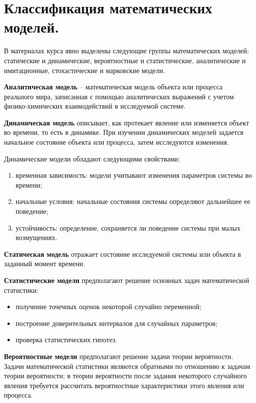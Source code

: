 \section{Классификация математических моделей.}

В материалах курса явно выделены следующие группы математических моделей:
статические и динамические, вероятностные и статистические, аналитические и
имитационные, стохастические и марковские модели.

\textbf{Аналитическая модель} -- математическая модель объекта или процесса
реального мира, записанная с помощью аналитических выражений с учетом
физико-химических взаимодействий в исследуемой системе.

\textbf{Динамическая модель} описывает, как протекает явление или изменяется
объект во времени, то есть в динамике. При изучении динамических моделей
задается начальное состояние объекта или процесса, затем исследуются
изменения.

Динамические модели обладают следующими свойствами:
\begin{enumerate}
  \item временная зависимость: модели учитывают изменения параметров
  системы во времени;
  \item начальные условия: начальные состояния системы определяют
  дальнейшее ее поведение;
  \item устойчивость: определение, сохраняется ли поведение системы при малых
  возмущениях.
\end{enumerate}

\textbf{Статическая модель} отражает состояние исследуемой системы или объекта
в заданный момент времени.

\textbf{Статистические модели} предполагают решение основных задач
математической статистики:
\begin{itemize}
  \item получение точечных оценок некоторой случайно переменной;
  \item построение доверительных интервалов для случайных параметров;
  \item проверка статистических гипотез.
\end{itemize}

\textbf{Вероятностные модели} предполагают решение задачи теории вероятности.
Задачи математической статистики являются обратными по отношению к задачам
теории вероятности: в теории вероятности после задания некоторого случайного
явления требуется рассчитать вероятностные характеристики этого явления или
процесса.

